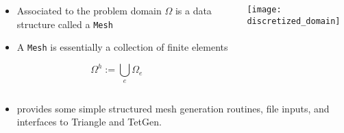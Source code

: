 \begin{frame}
  \begin{columns}[t]
    \begin{block}{}%
      \begin{itemize}
      \item{
	Associated to the problem domain $\Omega$ is a \libMesh{} data
	structure called a \texttt{Mesh}
      }
	
      \item{A \texttt{Mesh} is essentially
	a collection of finite elements}
      \end{itemize}
      \begin{equation}
	\label{eqn:discretized_domain}
	\nonumber
	\Omega^h:=\bigcup_e \Omega_e
      \end{equation}
    \end{block}
      \begin{center}
	\texttt{[image: discretized\_domain]}
      \end{center}
  \end{columns}
  {
  \begin{itemize}
    \item{\libMesh{} provides some simple structured mesh generation
routines, file inputs, and interfaces to Triangle and TetGen.}
  \end{itemize}
  }
\end{frame}
